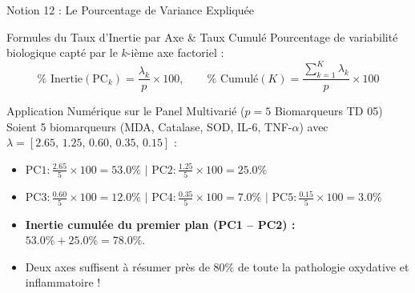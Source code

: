 \documentclass[aspectratio=169,10pt]{beamer}
\begin{document}
\begin{frame}{Notion 12 : Le Pourcentage de Variance Expliquée}
  \begin{conceptbox}{Formules du Taux d'Inertie par Axe \& Taux Cumulé}
    \footnotesize
    Pourcentage de variabilité biologique capté par le $k$-ième axe factoriel :
    \begin{equation*}
      \% \text{ Inertie}(\text{PC}_k) = \frac{\lambda_k}{p} \times 100, \qquad \% \text{ Cumulé}(K) = \frac{\sum_{k=1}^K \lambda_k}{p} \times 100
    \end{equation*}
  \end{conceptbox}
  \vspace{1mm}
  \begin{biobox}{Application Numérique sur le Panel Multivarié ($p = 5$ Biomarqueurs TD 05)}
    \footnotesize
    Soient 5 biomarqueurs (MDA, Catalase, SOD, IL-6, TNF-$\alpha$) avec $\lambda = [2.65, \, 1.25, \, 0.60, \, 0.35, \, 0.15]$ :
    \begin{itemize}
      \item $\text{PC1} : \frac{2.65}{5} \times 100 = \mathbf{53.0\%}$ \quad $\vert$ \quad $\text{PC2} : \frac{1.25}{5} \times 100 = \mathbf{25.0\%}$
      \item $\text{PC3} : \frac{0.60}{5} \times 100 = 12.0\%$ \quad $\vert$ \quad $\text{PC4} : \frac{0.35}{5} \times 100 = 7.0\%$ \quad $\vert$ \quad $\text{PC5} : \frac{0.15}{5} \times 100 = 3.0\%$
      \item \textbf{Inertie cumulée du premier plan (PC1 -- PC2) :} $53.0\% + 25.0\% = \mathbf{78.0\%}$.
      \item Deux axes suffisent à résumer près de $80\%$ de toute la pathologie oxydative et inflammatoire !
    \end{itemize}
  \end{biobox}
\end{frame}
\end{document}
